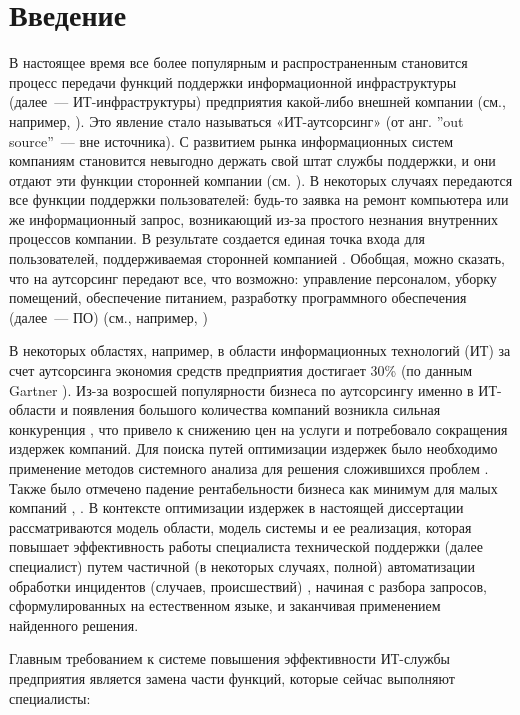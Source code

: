 \chapter*{Введение}							%

В настоящее время все более популярным и распространенным становится процесс передачи функций поддержки информационной инфраструктуры (далее~--- ИТ-инфраструктуры) предприятия какой-либо внешней компании (см., например, \cite{StartToOutsource}). Это явление стало называться «ИТ-аутсорсинг» (от анг. ”out source”~--– вне источника). С развитием рынка информационных систем компаниям становится невыгодно держать свой штат службы поддержки, и они отдают эти функции сторонней компании (см. \cite{OutsourceEff}). В некоторых случаях передаются все функции поддержки пользователей: будь-то заявка на ремонт компьютера или же информационный запрос, возникающий из-за простого незнания внутренних процессов компании. В результате создается единая точка входа для пользователей, поддерживаемая сторонней компанией \cite{OutsourceSD}. Обобщая, можно сказать, что на аутсорсинг передают все, что возможно: управление персоналом, уборку помещений, обеспечение питанием, разработку программного обеспечения (далее~--- ПО) (см., например, \cite{OutsourceSoft}) \etc \par
В некоторых областях, например, в области информационных технологий (ИТ) за счет аутсорсинга экономия средств предприятия достигает 30\% (по данным Gartner \cite{OutsourceIT}).
Из-за возросшей популярности бизнеса по аутсорсингу именно в ИТ-области и появления большого количества компаний возникла сильная конкуренция \cite{AUTOS-1}, что привело к снижению цен на услуги и потребовало сокращения издержек компаний. Для поиска путей оптимизации издержек было необходимо применение методов системного анализа для решения сложившихся проблем \cite{AUTOM-1}. Также было отмечено падение рентабельности бизнеса как минимум для малых компаний \cite{OUTSOURCE-RENT}, \cite{OutsourceEff}. В контексте оптимизации издержек в настоящей диссертации рассматриваются модель области, модель системы и ее реализация, которая повышает эффективность работы специалиста технической поддержки (далее специалист) путем частичной (в некоторых случаях, полной) автоматизации обработки инцидентов (случаев, происшествий)  \cite{SDAUTOM}, начиная с разбора запросов, сформулированных на естественном языке, и заканчивая применением найденного решения. \par
Главным требованием к системе повышения эффективности ИТ-службы предприятия является замена части функций, которые сейчас выполняют специалисты:
